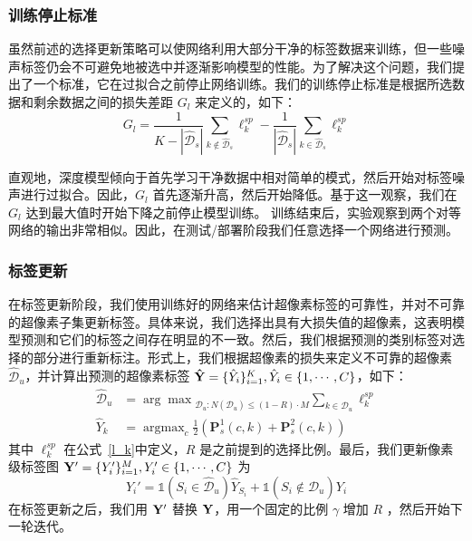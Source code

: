 \subsubsection{训练停止标准}
虽然前述的选择更新策略可以使网络利用大部分干净的标签数据来训练，但一些噪声标签仍会不可避免地被选中并逐渐影响模型的性能。为了解决这个问题，我们提出了一个标准，它在过拟合之前停止网络训练。我们的训练停止标准是根据所选数据和剩余数据之间的损失差距 $G_l$ 来定义的，如下：
\begin{equation}\label{loss_gap}
	G_{l} =    \frac{1}{K-|\mathcal{\hat{D}}_s|}\sum_{k \notin \mathcal{\hat{D}}_s}\ell_k^{sp} - \frac{1}{|\mathcal{\hat{D}}_s|}\sum_{k \in \mathcal{\hat{D}}_s}\ell_k^{sp} 
\end{equation}

直观地，深度模型倾向于首先学习干净数据中相对简单的模式，然后开始对标签噪声进行过拟合\citep{arpit2017closer}。因此，$G_{l}$ 首先逐渐升高，然后开始降低。基于这一观察，我们在 $G_{l}$ 达到最大值时开始下降之前停止模型训练。
训练结束后，实验观察到两个对等网络的输出非常相似。因此，在测试/部署阶段我们任意选择一个网络进行预测。

\subsubsection{标签更新}

在标签更新阶段，我们使用训练好的网络来估计超像素标签的可靠性，并对不可靠的超像素子集更新标签。具体来说，我们选择出具有大损失值的超像素，这表明模型预测和它们的标签之间存在明显的不一致。然后，我们根据预测的类别标签对选择的部分进行重新标注。形式上，我们根据超像素的损失来定义不可靠的超像素 $\mathcal{\hat{D}}_u$，并计算出预测的超像素标签 $\mathbf{\hat{Y}} =\{\hat{Y}_i\}_{i=1}^K,\hat{Y}_i\in \{1,\cdots,C\}$，如下：
\begin{align}
    {\mathcal{\hat{D}}}_u &= {\arg\max}_{{\mathcal{D}_u}: N({\mathcal{D}_u})\le (1-{R})\cdot M} \sum_{k\in{\mathcal{D}_u}}\ell_k^{sp} \\
    \hat{Y}_k &= \mathop{\arg\max}_{c}\frac{1}{2}(\mathbf{P}_s^1(c,k) + \mathbf{P}_s^2(c,k))
\end{align}
其中 $\ell_k^{sp}$ 在公式~\ref{l_k}中定义，$R$ 是之前提到的选择比例。最后，我们更新像素级标签图 $\mathbf{Y}'=\{Y'_i\}_{i=1}^M, Y'_i\in\{1,\cdots, C\}$ 为
\begin{equation}
	Y_i' = \mathds{1}(S_i \in {\mathcal{\hat{D}}}_u )\hat{Y}_{S_i} + \mathds{1}(S_i \notin {\mathcal{\hat{D}}}_u )Y_i
\end{equation}
在标签更新之后，我们用 $\mathbf{Y}'$ 替换 $\mathbf{Y}$，用一个固定的比例 $\gamma$ 增加 $R$ ，然后开始下一轮迭代。

